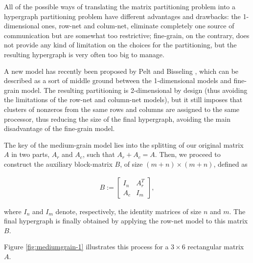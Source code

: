 All of the possible ways of translating the matrix partitioning problem into a hypergraph partitioning problem have different advantages and drawbacks: the 1-dimensional ones, row-net and colum-net, eliminate completely one source of communication but are somewhat too restrictive; fine-grain, on the contrary, does not provide any kind of limitation on the choices for the partitioning, but the resulting hypergraph is very often too big to manage.

A new model has recently been proposed by Pelt and Bisseling \cite{mediumgrain}, which can be described as a sort of middle ground between the 1-dimensional models and fine-grain model. The resulting partitioning is 2-dimensional by design (thus avoiding the limitations of the row-net and column-net models), but it still imposes that clusters of nonzeros from the same rows and columns are assigned to the same processor, thus reducing the size of the final hypergraph, avoiding the main disadvantage of the fine-grain model.

The key of the medium-grain model lies into the splitting of our original matrix $A$ in two parts, $A_r$ and $A_c$, such that $A_r + A_c = A$. Then, we proceed to construct the auxiliary block-matrix $B$, of size $(m+n) \times (m+n)$, defined as

\begin{align}
	B:=	\begin{bmatrix}
		I_n & A_r^T \\
		A_c & I_m
	\end{bmatrix},
	\label{eq:Bmatrix}
\end{align}

where $I_n$ and $I_m$ denote, respectively, the identity matrices of size $n$ and $m$. The final hypergraph is finally obtained by applying the row-net model to this matrix $B$. 

Figure \ref{fig:mediumgrain-1} illustrates this process for a $3 \times 6$ rectangular matrix $A$.

